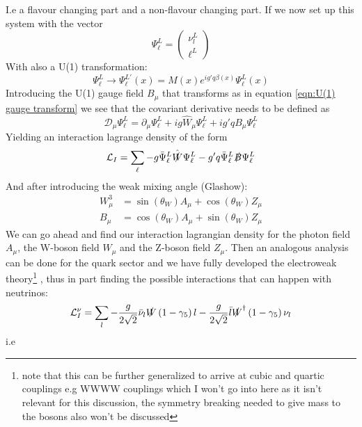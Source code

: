 \documentclass[11pt,a4paper,faculty=we,language=en,doctype=report]{cls/ugent-doc}
\begin{document}
I.e a flavour changing part and a non-flavour changing part. If we now set up this system with the vector
\begin{equation}
	\Psi_\ell^L = \left(\begin{matrix}\nu_l^L\\\ell^L\end{matrix}\right)
\end{equation}
With also a U(1) transformation:
\begin{equation}
	\Psi_\ell^L \rightarrow \Psi_\ell^{L'}(x) = M(x) e^{ig'q\beta(x)}\Psi_\ell^L(x)
\end{equation}
Introducing the U(1) gauge field $B_\mu$ that transforms as in equation \ref{eqn:U(1) gauge transform}
we see that the covariant derivative needs to be defined as 
\begin{equation}
	\mathcal{D}_\mu \Psi_\ell^L = \partial_\mu \Psi_\ell^L + ig\hat{W}_\mu \Psi_\ell^L + ig'qB_\mu\Psi_\ell^L
\end{equation}
Yielding an interaction lagrange density of the form
\begin{equation}
	\mathcal{L}_I = \sum_\ell - g\bar{\Psi}^L_\ell \hat{\slashed{W}}\Psi^L_\ell - g'q\bar{\Psi}_\ell^L\slashed{B}\Psi^L_\ell
\end{equation}
And after introducing the weak mixing angle (Glashow):
\begin{align}
	W_\mu^3 &= \sin(\theta_W)A_\mu + \cos{(\theta_W)}Z_\mu\\
	B_\mu &= \cos{(\theta_W)}A_\mu + \sin{(\theta_W)}Z_\mu
\end{align}
We can go ahead and find our interaction lagrangian density for the
photon field $A_\mu$, the W-boson field $W_\mu$ and the Z-boson field $Z_\mu$.
Then an analogous analysis can be done for the quark sector and we have fully 
developed the electroweak theory\footnote{note that this can be further generalized to arrive at
cubic and quartic couplings e.g WWWW couplings which I won't go into here as it isn't relevant 
for this discussion, the symmetry breaking needed to give mass to the bosons also won't be 
discussed}
, thus in part finding the possible interactions that can happen with neutrinos:
\begin{equation}
	\mathcal{L}_{I}^{\nu} =\sum_l-\frac{g}{2 \sqrt{2}} \bar{\nu}_l \slashed{W}\left(1-\gamma_5\right)l - \frac{g}{2 \sqrt{2}} \bar{l}\slashed{W}^\dagger\left(1-\gamma_5\right) \nu_l
\end{equation}
i.e
\end{document}
